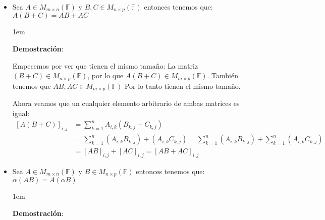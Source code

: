 \documentclass[12pt, fleqn]{report}                             %
\newenvironment{SmallIndentation}[1][0.75em]                    %
    {\begin{adjustwidth}{#1}{}\begin{footnotesize}}                 %
    {\end{footnotesize}\end{adjustwidth}}                           %
\begin{document}
                \begin{itemize}

                    \item Sea $A \in M_{m \times n}(\mathbb{F})$ y $B,C \in M_{n \times p}(\mathbb{F})$
                        entonces tenemos que:
                        $A(B+C) = AB+AC$

                        \begin{SmallIndentation}[1em]
                            \textbf{Demostración}:

                            Empecemos por ver que tienen el mismo tamaño:
                            La matriz $(B+C) \in M_{n \times p}(\mathbb{F})$, por lo que 
                            $A(B+C) \in M_{m \times p}(\mathbb{F})$.
                            También tenemos que $AB, AC \in M_{m \times p}(\mathbb{F})$
                            Por lo tanto tienen el mismo tamaño.

                            Ahora veamos que un cualquier elemento arbitrario de ambas matrices es igual:
                            \begin{equation*}
                            \begin{split}
                                [A(B+C)]_{i, j}    
                                    &= \sum_{k=1}^{n} A_{i, k}(B_{k, j}+C_{k, j})  \\            
                                    &= \sum_{k=1}^{n} (A_{i, k}B_{k, j}) + (A_{i, k}C_{k, j}) 
                                    = \sum_{k=1}^{n} (A_{i, k}B_{k, j}) + \sum_{k=1}^{n} (A_{i, k}C_{k, j}) \\
                                    &= [AB]_{i, j} + [AC]_{i, j} = [AB + AC]_{i, j} 
                            \end{split}
                            \end{equation*}

                        \end{SmallIndentation}

                    \item Sea $A \in M_{m \times n}(\mathbb{F})$ y $B \in M_{n \times p}(\mathbb{F})$
                        entonces tenemos que: $\alpha(AB) = A(\alpha B)$

                    \begin{SmallIndentation}[1em]
                        \textbf{Demostración}:


\end{SmallIndentation}
\end{itemize}
\end{document}
